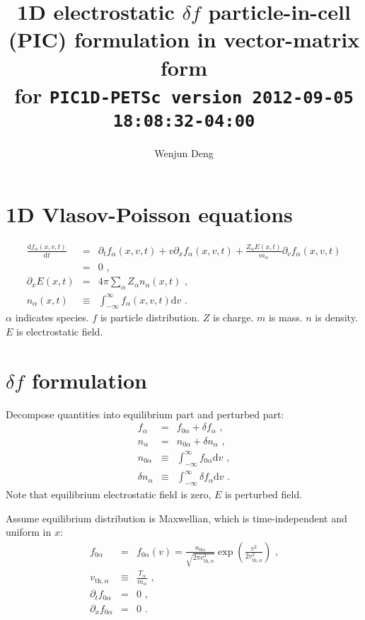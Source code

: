 \documentclass[12pt]{article}
\begin{document}
\newcommand{\md}{\mathrm{d}}
\newcommand{\me}{\mathrm{e}}

\title{1D electrostatic $\delta f$ particle-in-cell (PIC) formulation in vector-matrix form \\
\large for \texttt{PIC1D-PETSc version 2012-09-05 18:08:32-04:00}}
\author{Wenjun Deng}
\maketitle


\section{1D Vlasov-Poisson equations}

\begin{eqnarray}
	\frac{\md f_\alpha(x, v, t)}{\md t} & = & \partial_t f_\alpha(x, v, t) + v \partial_x f_\alpha(x, v, t) + \frac{Z_\alpha E(x, t)}{m_\alpha} \partial_v f_\alpha(x, v, t) \nonumber \\
	& = & 0 \textrm{ ,} \\
	\partial_x E(x, t) & = & 4 \pi \sum_\alpha Z_\alpha n_\alpha(x, t) \textrm{ ,} \\
	n_\alpha(x, t) & \equiv & \int_{-\infty}^{\infty} f_\alpha(x, v, t) \md v \textrm{ .}
\end{eqnarray}
$\alpha$ indicates species.
$f$ is particle distribution.
$Z$ is charge.
$m$ is mass.
$n$ is density.
$E$ is electrostatic field.


\section{$\delta f$ formulation}

Decompose quantities into equilibrium part and perturbed part:
\begin{eqnarray}
	f_\alpha & = & f_{0 \alpha} + \delta f_\alpha \textrm{ ,} \\
	n_\alpha & = & n_{0 \alpha} + \delta n_\alpha \textrm{ ,} \\
	n_{0 \alpha} & \equiv & \int_{-\infty}^{\infty} f_{0 \alpha} \md v \textrm{ ,} \\
	\delta n_{\alpha} & \equiv & \int_{-\infty}^{\infty} \delta f_{\alpha} \md v \textrm{ .}
\end{eqnarray}
Note that equilibrium electrostatic field is zero, $E$ is perturbed field.

Assume equilibrium distribution is Maxwellian, which is time-independent and uniform in $x$:
\begin{eqnarray}
	f_{0 \alpha} & = & f_{0 \alpha}(v) = \frac{n_{0 \alpha}}{\sqrt{2 \pi v_{\mathrm{th}, \alpha}^2}} \exp \left( \frac{v^2}{2 v_{\mathrm{th}, \alpha}^2} \right) \textrm{ ,} \\
	v_{\mathrm{th}, \alpha} & \equiv & \frac{T_\alpha}{m_\alpha} \textrm{ ,} \\
	\partial_t f_{0 \alpha} & = & 0 \textrm{ ,} \\
	\partial_x f_{0 \alpha} & = & 0 \textrm{ .}
\end{eqnarray}
\end{document}
